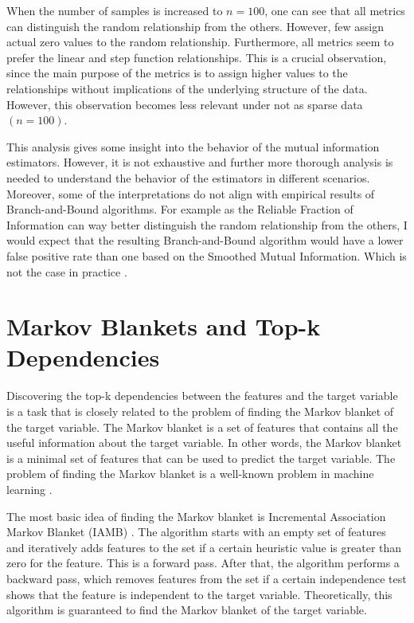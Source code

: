 \documentclass{article}
\begin{document}
When the number of samples is increased to $n=100$, one can see that all metrics can distinguish the random relationship from the others. However, few assign actual zero values to the random relationship. Furthermore, all metrics seem to prefer the linear and step function relationships. This is a crucial observation, since the main purpose of the metrics is to assign higher values to the relationships without implications of the underlying structure of the data. However, this observation becomes less relevant under not as sparse data $(n=100)$. 

This analysis gives some insight into the behavior of the mutual information estimators. However, it is not exhaustive and further more thorough analysis is needed to understand the behavior of the estimators in different scenarios. Moreover, some of the interpretations do not align with empirical results of Branch-and-Bound algorithms. For example as the Reliable Fraction of Information can way better distinguish the random relationship from the others, I would expect that the resulting Branch-and-Bound algorithm would have a lower false positive rate than one based on the Smoothed Mutual Information. Which is not the case in practice \citep{pennerath2020}.

\section{Markov Blankets and Top-k Dependencies}
Discovering the top-k dependencies between the features and the target variable is a task that is closely related to the problem of finding the Markov blanket of the target variable. The Markov blanket is a set of features that contains all the useful information about the target variable. In other words, the Markov blanket is a minimal set of features that can be used to predict the target variable. The problem of finding the Markov blanket is a well-known problem in machine learning \citep{tsamardinos2003}.

The most basic idea of finding the Markov blanket is Incremental Association Markov Blanket (IAMB) \citep{tsamardinos2003}. The algorithm starts with an empty set of features and iteratively adds features to the set if a certain heuristic value is greater than zero for the feature. This is a forward pass. After that, the algorithm performs a backward pass, which removes features from the set if a certain independence test shows that the feature is independent to the target variable. Theoretically, this algorithm is guaranteed to find the Markov blanket of the target variable. 
\end{document}
